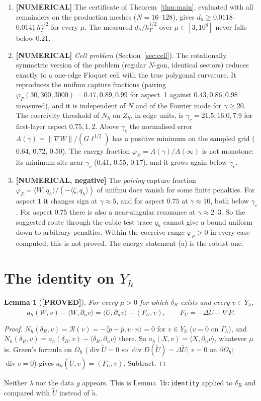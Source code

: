 \documentclass[11pt]{article}
\newtheorem{lemma}[theorem]{Lemma}
\theoremstyle{remark}
\newcommand{\hG}{h_\Gamma}
\newcommand{\Gh}{\Gamma_h}
\newcommand{\Oh}{\Omega_h}
\newcommand{\Zh}{Z_h}
\newcommand{\Yh}{Y_h}
\newcommand{\norm}[1]{\|#1\|}
\newcommand{\ip}[2]{\langle #1,#2\rangle}
\newcommand{\dn}{\partial_n}
\newcommand{\Ut}{\tilde U}
\newcommand{\ut}{\tilde u}
\newcommand{\pt}{\tilde p}
\newcommand{\pbar}{\bar p}
\newcommand{\lab}[1]{\textbf{[#1]}}
\newcommand{\Rc}{\mathcal R}
\renewcommand{\div}{\operatorname{div}}
\begin{document}
\begin{enumerate}[label=(\alph*)]
\item \lab{NUMERICAL} The certificate of Theorem~\ref{thm:main}, evaluated with all remainders on the production meshes ($N=16$--$128$), gives $d_h\ge0.0118$--$0.0141\,\hG^{1/2}$ for every $\mu$. The measured $d_h/\hG^{1/2}$ over $\mu\in[3,10^8]$ never falls below $0.21$.
\item \lab{NUMERICAL} \emph{Cell problem} (Section~\ref{sec:cell}). The rotationally symmetric version of the problem (regular $N$-gon, identical sectors) reduces exactly to a one-edge Floquet cell with the true polygonal curvature. It reproduces the unifmu capture fractions (pairing $\varphi_P(30,300,3000)=0.47,0.89,0.99$ for aspect~1 against $0.43,0.86,0.98$ measured), and it is independent of $N$ and of the Fourier mode for $\gamma\ge20$. The coercivity threshold of $N_h$ on $\Zh$, in edge units, is $\gamma_c=21.5,16.0,7.9$ for first-layer aspect $0.75,1,2$. Above $\gamma_c$ the normalised error $A(\gamma)=\norm{\nabla W}/(G\ell^{1/2})$ has a positive minimum on the sampled grid ($0.64$, $0.72$, $0.50$). The energy fraction $\varphi_E=A(\gamma)/A(\infty)$ is not monotone: its minimum sits near $\gamma_c$ ($0.41$, $0.55$, $0.17$), and it grows again below $\gamma_c$.
\item \lab{NUMERICAL, negative} The \emph{pairing} capture fraction $\varphi_P=\ip W{q_h}/(-\ip\zeta{q_h})$ of unifmu does vanish for some finite penalties. For aspect $1$ it changes sign at $\gamma\approx5$, and for aspect $0.75$ at $\gamma\approx10$, both below $\gamma_c$. For aspect $0.75$ there is also a near-singular resonance at $\gamma\approx2$--$3$. So the suggested route through the cubic test trace $q_h$ cannot give a bound uniform down to arbitrary penalties. Within the coercive range $\varphi_P>0$ in every case computed; this is not proved. The energy statement (a) is the robust one.
\end{enumerate}

\section{The identity on $\Yh$}
\begin{lemma}[\lab{PROVED}]\label{lem:id}
For every $\mu>0$ for which $\delta_R$ exists and every $v\in\Yh$,
\[
a_h(W,v)-\ip{W}{\dn v}=\ip{\Ut}{\dn v}-(F_U,v),\qquad F_U=-\Delta\Ut+\nabla\tilde P .
\]
\end{lemma}
\begin{proof}
$N_h(\delta_R,v)=\Rc(v)=-\ip{\pt-\pbar}{v\cdot n}=0$ for $v\in\Yh$ ($v=0$ on $\Gh$), and $N_h(\delta_R,v)=a_h(\delta_R,v)-\ip{\delta_R}{\dn v}$ there. So $a_h(X,v)=\ip X{\dn v}$, whatever $\mu$ is. Green's formula on $\Oh$ ($\div\Ut=0$ so $\div D(\Ut)=\Delta\Ut$; $v=0$ on $\partial\Oh$; $\div v=0$) gives $a_h(\Ut,v)=(F_U,v)$. Subtract.
\end{proof}
Neither $\lambda$ nor the data $g$ appears. This is Lemma~\texttt{lb:identity} applied to $\delta_R$ and compared with $\Ut$ instead of $\ut$.
\end{document}
